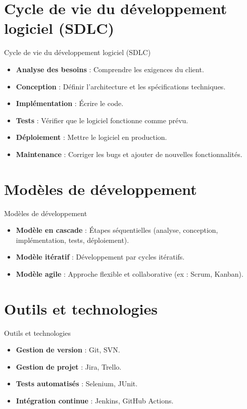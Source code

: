 \documentclass{clbeamer2024}
\begin{document}
	\section{Cycle de vie du développement logiciel (SDLC)}
	\begin{frame}{Cycle de vie du développement logiciel (SDLC)}
		\begin{itemize}
			\item \textbf{Analyse des besoins} : Comprendre les exigences du client.
			\item \textbf{Conception} : Définir l'architecture et les spécifications techniques.
			\item \textbf{Implémentation} : Écrire le code.
			\item \textbf{Tests} : Vérifier que le logiciel fonctionne comme prévu.
			\item \textbf{Déploiement} : Mettre le logiciel en production.
			\item \textbf{Maintenance} : Corriger les bugs et ajouter de nouvelles fonctionnalités.
		\end{itemize}
	\end{frame}
	
	\section{Modèles de développement}
	\begin{frame}{Modèles de développement}
		\begin{itemize}
			\item \textbf{Modèle en cascade} : Étapes séquentielles (analyse, conception, implémentation, tests, déploiement).
			\item \textbf{Modèle itératif} : Développement par cycles itératifs.
			\item \textbf{Modèle agile} : Approche flexible et collaborative (ex : Scrum, Kanban).
		\end{itemize}
	\end{frame}
	
	
	\section{Outils et technologies}
	\begin{frame}{Outils et technologies}
		\begin{itemize}
			\item \textbf{Gestion de version} : Git, SVN.
			\item \textbf{Gestion de projet} : Jira, Trello.
			\item \textbf{Tests automatisés} : Selenium, JUnit.
			\item \textbf{Intégration continue} : Jenkins, GitHub Actions.
		\end{itemize}
	\end{frame}
	
\end{document}
